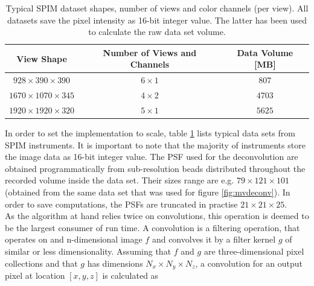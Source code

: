 \begin{table}[bht]
  \label{typ_datasets}
  
  \begin{tabular}{ccc}                                                                                                                                                                              
    \hline                                                                                                                                                                                         
    View Shape  & Number of Views and Channels & Data Volume [MB]   \\
    \hline                                                       
    $928\times390\times390$ & $6 \times 1$ & $807$ \\
    $1670\times1070\times345$ & $4 \times 2$ & $4703$ \\
    $1920\times1920\times320$ & $5 \times 1$ & $5625$ \\
    \hline                                                                                                                                                                                         
  \end{tabular} 
  \caption{Typical SPIM dataset shapes, number of views and color channels (per view). All datasets save the pixel intensity as 16-bit integer value. The latter has been used to calculate the raw data set volume.}
\end{table} 

In order to set the implementation to scale, table \ref{typ_datasets} lists typical data sets from SPIM instruments. It is important to note that the majority of instruments store the image data as 16-bit integer value. The PSF used for the deconvolution are obtained programmatically from sub-resolution beads distributed throughout the recorded volume inside the data set. Their sizes range are e.g. $79 \times 121 \times 101$ (obtained from the same data set that was used for figure \ref{fig:mvdeconv}). In order to save computations, the PSFs are truncated in practise $21 \times 21 \times 25$. \\

As the algorithm at hand relies twice on convolutions, this operation is deemed to be the largest consumer of run time. A convolution is a filtering operation, that operates on and n-dimensional image $f$ and convolves it by a filter kernel $g$ of similar or less dimensionality. Assuming that $f$ and $g$ are three-dimensional pixel collections and that $g$ has dimensions $N_{x} \times N_{y} \times N_{z}$, a convolution for an output pixel at location $[x,y,z]$ is calculated as 

